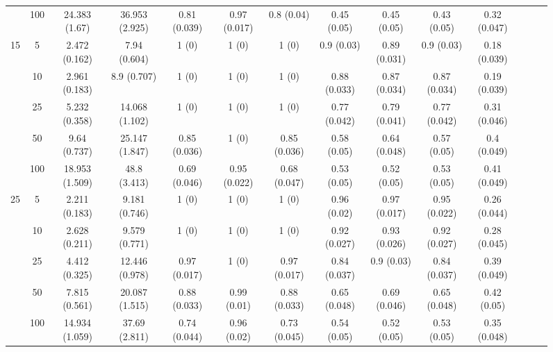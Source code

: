\documentclass[10pt]{article}
\theoremstyle{definition}
\begin{document}
\begin{sidewaysfigure}
\begin{tabular}{cc|cc|ccc|ccc|ccc|c}
    & 100  & 24.383 (1.67) & 36.953 (2.925) & 0.81 (0.039) & 0.97 (0.017) & 0.8 (0.04) & 0.45 (0.05) & 0.45 (0.05) & 0.43 (0.05) & 0.32 (0.047)  \\[.3cm] 
    \multirow{5}{*}{15} & 5  & 2.472 (0.162) & 7.94 (0.604) & 1 (0) & 1 (0) & 1 (0) & 0.9 (0.03) & 0.89 (0.031) & 0.9 (0.03) & 0.18 (0.039) \\ 
    & 10  & 2.961 (0.183) & 8.9 (0.707) & 1 (0) & 1 (0) & 1 (0) & 0.88 (0.033) & 0.87 (0.034) & 0.87 (0.034) & 0.19 (0.039) \\ 
   & 25  & 5.232 (0.358) & 14.068 (1.102) & 1 (0) & 1 (0) & 1 (0) & 0.77 (0.042) & 0.79 (0.041) & 0.77 (0.042) & 0.31 (0.046) \\ 
    & 50  & 9.64 (0.737) & 25.147 (1.847) & 0.85 (0.036) & 1 (0) & 0.85 (0.036) & 0.58 (0.05) & 0.64 (0.048) & 0.57 (0.05) & 0.4 (0.049) \\ 
    & 100  & 18.953 (1.509) & 48.8 (3.413) & 0.69 (0.046) & 0.95 (0.022) & 0.68 (0.047) & 0.53 (0.05) & 0.52 (0.05) & 0.53 (0.05) & 0.41 (0.049)  \\[.3cm] 
    \multirow{5}{*}{25} & 5  & 2.211 (0.183) & 9.181 (0.746) & 1 (0) & 1 (0) & 1 (0) & 0.96 (0.02) & 0.97 (0.017) & 0.95 (0.022) & 0.26 (0.044) \\ 
    & 10  & 2.628 (0.211) & 9.579 (0.771) & 1 (0) & 1 (0) & 1 (0) & 0.92 (0.027) & 0.93 (0.026) & 0.92 (0.027) & 0.28 (0.045) \\ 
    & 25  & 4.412 (0.325) & 12.446 (0.978) & 0.97 (0.017) & 1 (0) & 0.97 (0.017) & 0.84 (0.037) & 0.9 (0.03) & 0.84 (0.037) & 0.39 (0.049) \\ 
   & 50  & 7.815 (0.561) & 20.087 (1.515) & 0.88 (0.033) & 0.99 (0.01) & 0.88 (0.033) & 0.65 (0.048) & 0.69 (0.046) & 0.65 (0.048) & 0.42 (0.05) \\ 
    & 100  & 14.934 (1.059) & 37.69 (2.811) & 0.74 (0.044) & 0.96 (0.02) & 0.73 (0.045) & 0.54 (0.05) & 0.52 (0.05) & 0.53 (0.05) & 0.35 (0.048) \\
\end{tabular}
\end{sidewaysfigure}

\end{document}
